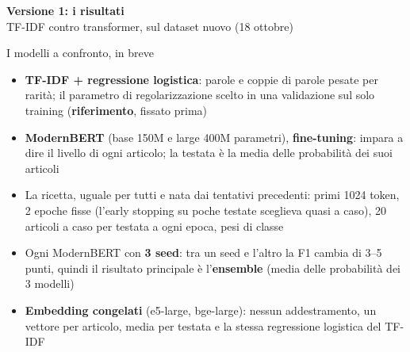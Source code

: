 \documentclass[aspectratio=169]{beamer}
\newcommand{\hl}[1]{\textbf{#1}}
\newcommand{\divider}[2]{%
  \begin{frame}[plain]
    \vfill
    \begin{center}
      {\color{dividerblue}\Huge\textbf{#1}}\\[0.8em]
      {\large #2}
    \end{center}
    \vfill
  \end{frame}}
\begin{document}
\divider{Versione 1: i risultati}{TF-IDF contro transformer, sul dataset nuovo (18 ottobre)}

\begin{frame}{I modelli a confronto, in breve}
  \begin{itemize}[<+->]
    \setlength\itemsep{0.6em}
    \small
    \item \hl{TF-IDF + regressione logistica}: parole e coppie di parole pesate per rarit\`a; il parametro di regolarizzazione scelto in una validazione sul solo training (\hl{riferimento}, fissato prima)
    \item \hl{ModernBERT} (base 150M e large 400M parametri), \hl{fine-tuning}: impara a dire il livello di ogni articolo; la testata \`e la media delle probabilit\`a dei suoi articoli
    \item[] La ricetta, uguale per tutti e nata dai tentativi precedenti: primi 1024 token, 2 epoche fisse (l'early stopping su poche testate sceglieva quasi a caso), 20 articoli a caso per testata a ogni epoca, pesi di classe
    \item[] Ogni ModernBERT con \hl{3 seed}: tra un seed e l'altro la F1 cambia di 3--5 punti, quindi il risultato principale \`e l'\hl{ensemble} (media delle probabilit\`a dei 3 modelli)
    \item \hl{Embedding congelati} (e5-large, bge-large): nessun addestramento, un vettore per articolo, media per testata e la stessa regressione logistica del TF-IDF
  \end{itemize}
\end{frame}
\end{document}
